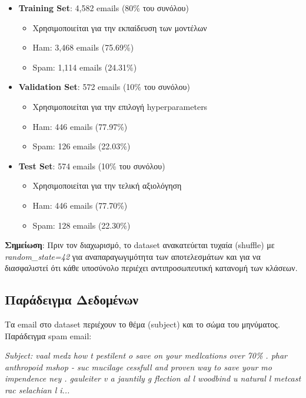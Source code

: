 \documentclass[12pt,a4paper,twoside]{book}
\begin{document}
\begin{itemize}
    \item \textbf{Training Set}: 4,582 emails (80\% του συνόλου)
          \begin{itemize}
              \item Χρησιμοποιείται για την εκπαίδευση των μοντέλων
              \item Ham: 3,468 emails (75.69\%)
              \item Spam: 1,114 emails (24.31\%)
          \end{itemize}

    \item \textbf{Validation Set}: 572 emails (10\% του συνόλου)
          \begin{itemize}
              \item Χρησιμοποιείται για την επιλογή hyperparameters
              \item Ham: 446 emails (77.97\%)
              \item Spam: 126 emails (22.03\%)
          \end{itemize}

    \item \textbf{Test Set}: 574 emails (10\% του συνόλου)
          \begin{itemize}
              \item Χρησιμοποιείται για την τελική αξιολόγηση
              \item Ham: 446 emails (77.70\%)
              \item Spam: 128 emails (22.30\%)
          \end{itemize}
\end{itemize}

\textbf{Σημείωση}: Πριν τον διαχωρισμό, το dataset ανακατεύεται τυχαία (shuffle) με \textit{random\_state=42} για αναπαραγωγιμότητα των αποτελεσμάτων και για να διασφαλιστεί ότι κάθε υποσύνολο περιέχει αντιπροσωπευτική κατανομή των κλάσεων.

\subsection{Παράδειγμα Δεδομένων}

Τα email στο dataset περιέχουν το θέμα (subject) και το σώμα του μηνύματος. Παράδειγμα spam email:

\begin{tcolorbox}[colback=customBgGray!30, colframe=customCodeRed, title=Παράδειγμα Spam Email]
    \small
    \textit{Subject: vaal medz how t pestilent o save on your medlcations over 70\% . phar anthropoid mshop - suc mucilage cessfull and proven way to save your mo impendence ney . gauleiter v a jauntily g flection al l woodbind u natural l metcast rac selachian l i...}
\end{tcolorbox}
\end{document}
